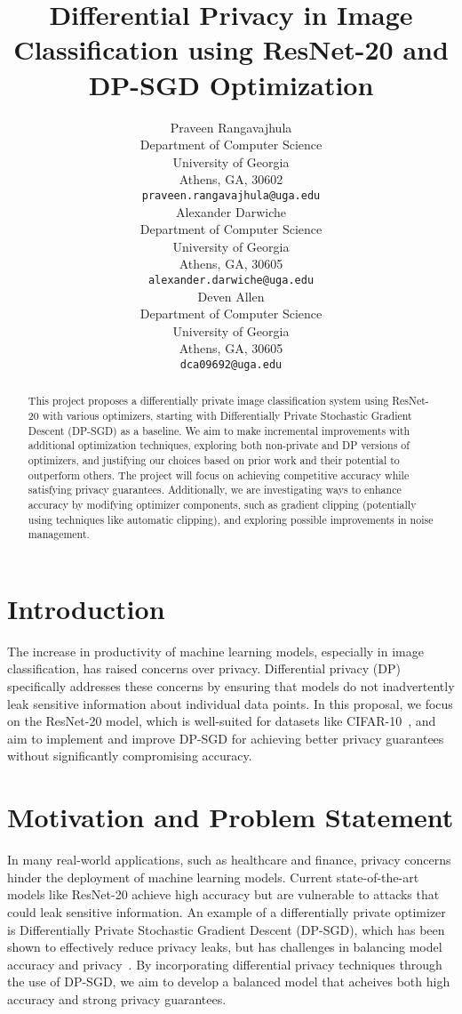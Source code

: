 \documentclass{article}
\title{Differential Privacy in Image Classification using ResNet-20 and DP-SGD Optimization}
\author{
    Praveen Rangavajhula\\
    Department of Computer Science\\
    University of Georgia\\
    Athens, GA, 30602\\
    \texttt{praveen.rangavajhula@uga.edu} \\
    \And
    Alexander Darwiche\\
    Department of Computer Science\\
    University of Georgia\\
    Athens, GA, 30605 \\
    \texttt{alexander.darwiche@uga.edu} \\
    \And
    Deven Allen\\
    Department of Computer Science\\
    University of Georgia\\
    Athens, GA, 30605 \\
    \texttt{dca09692@uga.edu} \\
}
\begin{document}
    \maketitle

    \begin{abstract}

        This project proposes a differentially private image classification system using ResNet-20 with various
        optimizers, starting with Differentially Private Stochastic Gradient Descent (DP-SGD) as a baseline.
        We aim to make incremental improvements with additional optimization techniques, exploring both non-private
        and DP versions of optimizers, and justifying our choices based on prior work and their potential
        to outperform others.
        The project will focus on achieving competitive accuracy while satisfying privacy guarantees.
        Additionally, we are investigating ways to enhance accuracy by modifying optimizer components,
        such as gradient clipping (potentially using techniques like automatic clipping), and exploring
        possible improvements in noise management.

    \end{abstract}


    \section{Introduction}\label{sec:introduction}

    The increase in productivity of machine learning models, especially in image classification, has raised concerns over privacy. 
    Differential privacy (DP) specifically addresses these concerns by ensuring that models do not inadvertently leak sensitive 
    information about individual data points. 
    In this proposal, we focus on the ResNet-20 model, which is well-suited for datasets like CIFAR-10~\cite{Idelbayev_ResNet20}, 
    and aim to implement and improve DP-SGD for achieving better privacy guarantees without significantly compromising accuracy.


    \section{Motivation and Problem Statement}\label{sec:motivation-and-problem-statement}
    In many real-world applications, such as healthcare and finance, privacy concerns hinder the deployment of machine
    learning models.
    Current state-of-the-art models like ResNet-20 achieve high accuracy but are vulnerable to attacks that could leak 
    sensitive information. 
    An example of a differentially private optimizer is Differentially Private Stochastic Gradient Descent (DP-SGD), which has been shown
    to effectively reduce privacy leaks, but has challenges in balancing model accuracy and privacy~\cite{Abadi_2016_DeepLearningDifferentialPrivacy}.
    By incorporating differential privacy techniques through the use of DP-SGD, we aim to develop a balanced model that acheives both high accuracy 
    and strong privacy guarantees.
\end{document}
